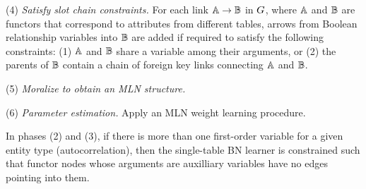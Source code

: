 \documentclass[letterpaper]{article}
\begin{document}
(4) {\em Satisfy slot chain constraints.} For each link $\mathbb{A} \rightarrow \mathbb{B}$ in $G$, where $\mathbb{A}$ and $\mathbb{B}$ are functors that correspond to attributes from different tables, arrows from Boolean relationship variables into $\mathbb{B}$ are added if required to satisfy the following constraints: (1) $\mathbb{A}$ and $\mathbb{B}$ share a variable among their arguments, or (2) the parents of $\mathbb{B}$ contain a chain of foreign key links connecting $\mathbb{A}$ and $\mathbb{B}$. 

(5) {\em Moralize to obtain an MLN structure.} 

(6) {\em Parameter estimation.} Apply an MLN weight learning procedure. 

In phases (2) and (3), if there is more than one first-order variable for a given entity type (autocorrelation), then the single-table BN learner is constrained such that functor nodes whose arguments are auxilliary variables have no edges pointing into them. 
\end{document}
